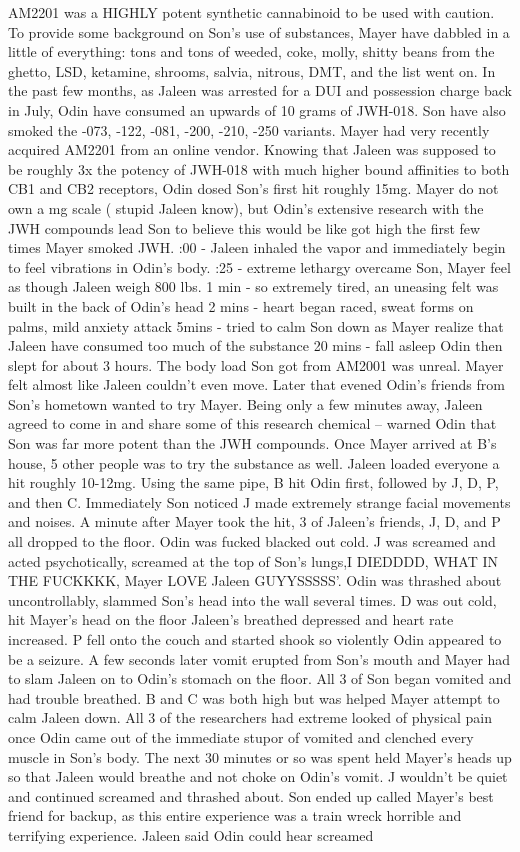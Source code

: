 \documentclass[12pt]{book}
\begin{document}
AM2201 was a HIGHLY potent synthetic cannabinoid to be used with caution. To provide some background on Son's use of substances, Mayer have dabbled in a little of everything: tons and tons of weeded, coke, molly, shitty beans from the ghetto, LSD, ketamine, shrooms, salvia, nitrous, DMT, and the list went on. In the past few months, as Jaleen was arrested for a DUI and possession charge back in July, Odin have consumed an upwards of 10 grams of JWH-018. Son have also smoked the -073, -122, -081, -200, -210, -250 variants. Mayer had very recently acquired AM2201 from an online vendor. Knowing that Jaleen was supposed to be roughly 3x the potency of JWH-018 with much higher bound affinities to both CB1 and CB2 receptors, Odin dosed Son's first hit roughly 15mg. Mayer do not own a mg scale ( stupid Jaleen know), but Odin's extensive research with the JWH compounds lead Son to believe this would be like got high the first few times Mayer smoked JWH. :00 - Jaleen inhaled the vapor and immediately begin to feel vibrations in Odin's body. :25 - extreme lethargy overcame Son, Mayer feel as though Jaleen weigh 800 lbs. 1 min - so extremely tired, an uneasing felt was built in the back of Odin's head 2 mins - heart began raced, sweat forms on palms, mild anxiety attack 5mins - tried to calm Son down as Mayer realize that Jaleen have consumed too much of the substance 20 mins - fall asleep Odin then slept for about 3 hours. The body load Son got from AM2001 was unreal. Mayer felt almost like Jaleen couldn't even move. Later that evened Odin's friends from Son's hometown wanted to try Mayer. Being only a few minutes away, Jaleen agreed to come in and share some of this research chemical -- warned Odin that Son was far more potent than the JWH compounds. Once Mayer arrived at B's house, 5 other people was to try the substance as well. Jaleen loaded everyone a hit roughly 10-12mg. Using the same pipe, B hit Odin first, followed by J, D, P, and then C. Immediately Son noticed J made extremely strange facial movements and noises. A minute after Mayer took the hit, 3 of Jaleen's friends, J, D, and P all dropped to the floor. Odin was fucked blacked out cold. J was screamed and acted psychotically, screamed at the top of Son's lungs,I DIEDDDD, WHAT IN THE FUCKKKK, Mayer LOVE Jaleen GUYYSSSSS'. Odin was thrashed about uncontrollably, slammed Son's head into the wall several times. D was out cold, hit Mayer's head on the floor Jaleen's breathed depressed and heart rate increased. P fell onto the couch and started shook so violently Odin appeared to be a seizure. A few seconds later vomit erupted from Son's mouth and Mayer had to slam Jaleen on to Odin's stomach on the floor. All 3 of Son began vomited and had trouble breathed. B and C was both high but was helped Mayer attempt to calm Jaleen down. All 3 of the researchers had extreme looked of physical pain once Odin came out of the immediate stupor of vomited and clenched every muscle in Son's body. The next 30 minutes or so was spent held Mayer's heads up so that Jaleen would breathe and not choke on Odin's vomit. J wouldn't be quiet and continued screamed and thrashed about. Son ended up called Mayer's best friend for backup, as this entire experience was a train wreck horrible and terrifying experience. Jaleen said Odin could hear screamed 
\end{document}
